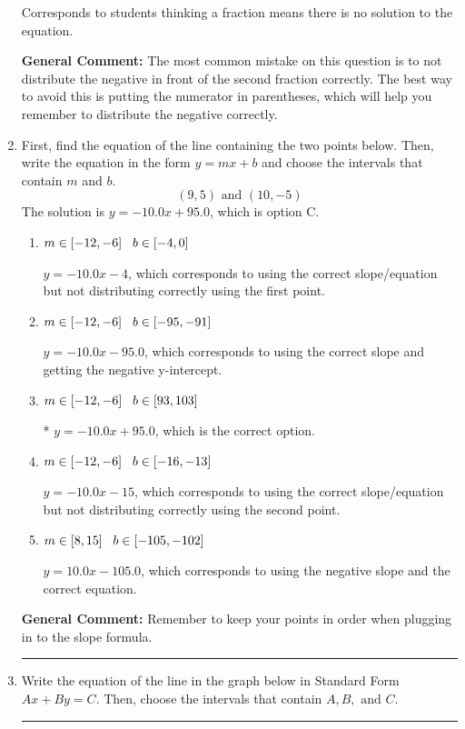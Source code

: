 \documentclass{extbook}[14pt]
\newcommand{\litem}[1]{\item #1

\rule{\textwidth}{0.4pt}}
\begin{document}
\begin{enumerate}
{\begin{enumerate}[label=\Alph*.]
Corresponds to students thinking a fraction means there is no solution to the equation.
\end{enumerate}

\textbf{General Comment:} The most common mistake on this question is to not distribute the negative in front of the second fraction correctly. The best way to avoid this is putting the numerator in parentheses, which will help you remember to distribute the negative correctly.
}
\litem{
First, find the equation of the line containing the two points below. Then, write the equation in the form $ y=mx+b $ and choose the intervals that contain $m$ and $b$.
\[ (9, 5) \text{ and } (10, -5) \]The solution is \( y = -10.0x + 95.0 \), which is option C.\begin{enumerate}[label=\Alph*.]
\item \( m \in [-12, -6] \hspace*{3mm} b \in [-4, 0] \)

 $y = -10.0x -4$, which corresponds to using the correct slope/equation but not distributing correctly using the first point.
\item \( m \in [-12, -6] \hspace*{3mm} b \in [-95, -91] \)

 $y = -10.0x -95.0$, which corresponds to using the correct slope and getting the negative y-intercept.
\item \( m \in [-12, -6] \hspace*{3mm} b \in [93, 103] \)

* $y = -10.0x + 95.0$, which is the correct option.
\item \( m \in [-12, -6] \hspace*{3mm} b \in [-16, -13] \)

 $y = -10.0x -15$, which corresponds to using the correct slope/equation but not distributing correctly using the second point.
\item \( m \in [8, 15] \hspace*{3mm} b \in [-105, -102] \)

 $y = 10.0x -105.0$, which corresponds to using the negative slope and the correct equation.
\end{enumerate}

\textbf{General Comment:} Remember to keep your points in order when plugging in to the slope formula.
}
\litem{
Write the equation of the line in the graph below in Standard Form $Ax+By=C$. Then, choose the intervals that contain $A, B, \text{ and } C$.

}
\end{enumerate}
\end{document}
